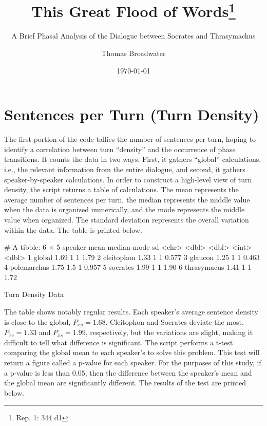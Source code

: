 \documentclass[noraggedright]{turabian-researchpaper}
\title{This Great Flood of Words\thanks{Rep. 1: 344 d1}}
\subtitle{A Brief Phasal Analysis of the Dialogue
  between Socrates and Thrasymachus}
\author{Thomas Broadwater}
\date{\today}
\begin{document}






\maketitle


%

\section{Sentences per Turn (Turn Density)}



The first portion of the code tallies the number of sentences per turn, hoping
to identify a correlation between turn ``density'' and the occurrence of phase
transitions. It counts the data in two ways. First, it gathers ``global''
calculations, i.e., the relevant information from the entire dialogue, and
second, it gathers speaker-by-speaker calculations. In order to construct a
high-level view of turn density, the script returns a table of calculations.
The mean represents the average number of sentences per turn, the median
represents the middle value when the data is organized numerically, and the mode
represents the middle value when organized. The standard deviation represents
the overall variation within the data. The table is printed below.

\begin{table}
\begin{Schunk}
\begin{Soutput}
# A tibble: 6 × 5
  speaker      mean median  mode    sd
  <chr>       <dbl>  <dbl> <int> <dbl>
1 global       1.69    1       1 1.79 
2 cleitophon   1.33    1       1 0.577
3 glaucon      1.25    1       1 0.463
4 polemarchus  1.75    1.5     1 0.957
5 socrates     1.99    1       1 1.90 
6 thrasymacus  1.41    1       1 1.72 
\end{Soutput}
\end{Schunk}
\caption{Turn Density Data}
\label{tab:DensityData}
\end{table}

The table shows notably regular results. Each speaker's average sentence
density is close to the global, $P_{\bar{x}g} = 1.68$. Cleitophon and Socrates
deviate the most, $P_{\bar{x}c} = 1.33$ and $P_{\bar{x}s} = 1.99$, respectively, but
the variations are slight, making it difficult to tell what difference is
significant. The script performs a t-test comparing the global mean to each
speaker's to solve this problem. This test will return a figure called a
p-value for each speaker. For the purposes of this study, if a p-value is less
than 0.05, then the difference between the speaker's mean and the global mean
are significantly different. The results of the test are printed below.
\end{document}
